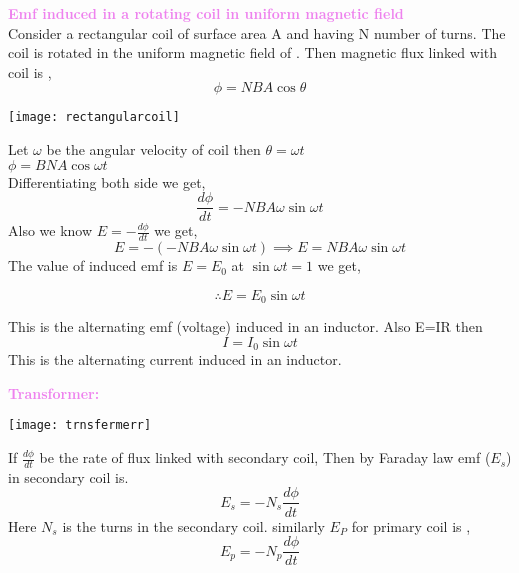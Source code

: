 \documentclass{beamer}
\begin{document}
\begin{frame}

\textcolor{violet}{\textbf{Emf induced in a rotating coil in uniform magnetic field}}\\
Consider a rectangular coil of surface area A and having N number of turns. The coil is rotated in the uniform magnetic field of . Then magnetic flux linked with coil is ,\\
\[
\phi=NBA\cos\theta
\]
\begin{center}
\texttt{[image: rectangularcoil]}
\end{center}

\end{frame}


\begin{frame}

Let $\omega$ be the angular velocity of coil then $\theta=\omega t$\\
\hspace{4cm} $\phi=BNA\cos\omega t$\\
Differentiating both side we get,
\[
\frac{d\phi}{dt}=-NBA\omega\sin\omega t
\]
Also we know $E=-\frac{d\phi}{dt}$ we get,
\[
E=-(-NBA\omega \sin\omega t) \implies E=NBA\omega \sin\omega t
\]
The value of induced emf is $E=E_0$ at $\sin\omega t=1$ we get,
 

\[
\therefore E=E_0\sin\omega t
\]

This is the alternating emf (voltage) induced in an inductor. Also E=IR then \\
\[
 I=I_0\sin\omega t
 \]
 This is the alternating current induced in an inductor.
\end{frame}


\begin{frame}
\textcolor{violet}{\textbf{Transformer:}}\\
\begin{center}
\texttt{[image: trnsfermerr]}
\end{center}
If $\frac{d\phi}{dt} $ be the rate of flux linked with secondary coil, Then by Faraday law emf ($E_s$) in secondary coil is.
\[
E_s=-N_s\frac{d\phi}{dt}
\]
Here $N_s$ is the turns in the secondary coil. similarly $E_P$ for primary coil is ,
\[
E_p=-N_p\frac{d\phi}{dt}
\]

\end{frame}
\end{document}
